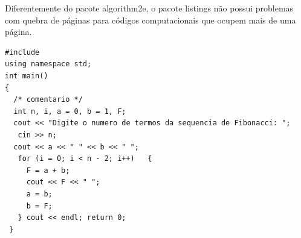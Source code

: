 Diferentemente do pacote \textsf{algorithm2e}, o pacote \textsf{listings} não
possui problemas com quebra de páginas para códigos computacionais que ocupem
mais de uma página.

\setcounter{lstlisting}{98}

\begin{lstlisting}[caption=Exemplo de código em C++ usando o pacote \texttt{listings},label=ex-listing-two]
#include 
using namespace std;
int main()
{
  /* comentario */
  int n, i, a = 0, b = 1, F;
  cout << "Digite o numero de termos da sequencia de Fibonacci: ";
   cin >> n;
  cout << a << " " << b << " ";
   for (i = 0; i < n - 2; i++)   {
     F = a + b;
     cout << F << " ";
     a = b;
     b = F;
   } cout << endl; return 0;
 }
\end{lstlisting}